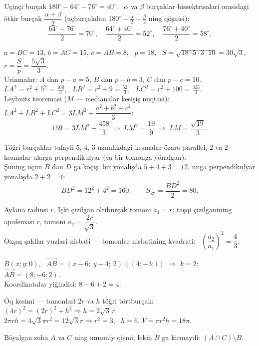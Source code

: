 Uçinçi burçak $180^\circ-64^\circ-76^\circ=40^\circ$. \ $\alpha$ va $\beta$ burçaklar bissektrisalari orasidagi ötkir burçak $\dfrac{\alpha+\beta}2$ (uçburçakdan $180^\circ-\frac\alpha2-\frac\beta2$ ning qöşnisi):
\[\frac{64^\circ+76^\circ}2=70^\circ,\quad \frac{64^\circ+40^\circ}2=52^\circ,\quad \frac{76^\circ+40^\circ}2=58^\circ.\]

$a=BC=13$, $b=AC=15$, $c=AB=8$, \ $p=18$, \ $S=\sqrt{18\cdot5\cdot3\cdot10}=30\sqrt3$, \ $r=\dfrac Sp=\dfrac{5\sqrt3}3$.\\
Urinmalar: $A$ dan $p-a=5$, $B$ dan $p-b=3$, $C$ dan $p-c=10$. \ $LA^2=r^2+5^2=\frac{100}3$, \ $LB^2=r^2+9=\frac{52}3$, \ $LC^2=r^2+100=\frac{325}3$.\\
Leybnits teoremasi ($M$ — medianalar kesişiş nuqtasi): \ $LA^2+LB^2+LC^2=3LM^2+\dfrac{a^2+b^2+c^2}3$:
\[159=3LM^2+\frac{458}3\ \Rightarrow\ LM^2=\frac{19}9\ \Rightarrow\ LM=\frac{\sqrt{19}}3.\]

Töğri burçaklar tufayli $5$, $4$, $3$ uzunlikdagi kesmalar özaro parallel, $2$ va $2$ kesmalar ularga perpendikulyar (va bir tomonga yönalgan).\\
Şuning uçun $B$ dan $D$ ga köçiş: bir yönalişda $5+4+3=12$, unga perpendikulyar yönalişda $2+2=4$:
\[BD^2=12^2+4^2=160,\qquad S_{\text{kv}}=\frac{BD^2}2=80.\]

Aylana radiusi $r$. Içki çizilgan oltiburçak tomoni $a_1=r$; taşqi çizilganining apofemasi $r$, tomoni $a_2=\dfrac{2r}{\sqrt3}$.\\
Öxşaş şakllar yuzlari nisbati — tomonlar nisbatining kvadrati: \ $\left(\dfrac{a_2}{a_1}\right)^2=\dfrac43$.

$B(x;y;0)$, \ $\overrightarrow{AB}=(x-6;\ y-4;\ 2)\parallel(4;-3;1)$ $\Rightarrow$ $k=2$: \ $\overrightarrow{AB}=(8;-6;2)$.\\
Koordinatalar yiğindisi: $8-6+2=4$.

Öq kesimi — tomonlari $2r$ va $h$ töğri törtburçak: \ $(4r)^2=(2r)^2+h^2\Rightarrow h=2\sqrt3\,r$.\\
$2\pi rh=4\sqrt3\pi r^2=12\sqrt3\pi\Rightarrow r^2=3$, \ $h=6$. \quad $V=\pi r^2h=18\pi$.

Böyalgan soha $A$ va $C$ ning umumiy qismi, lekin $B$ ga kirmaydi: $(A\cap C)\setminus B$.

